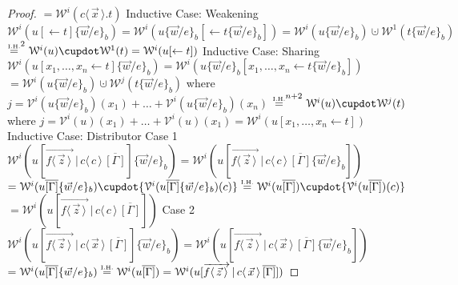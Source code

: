 \documentclass[a4paper,UKenglish,cleveref, autoref]{lipics-v2019}
\newcommand{\set}[1]{ \{ #1 \} }
\newcommand{\fake}[3]{#1 \langle \, #2 \, \rangle . #3}
\newcommand{\share}[3]{#1 [#2 \leftarrow #3]}
\newcommand{\dist}[5]{#1 [ #2 \, \vert \, \fakedist{#4}{#5} \, #3 ]}
\newcommand{\fakedist}[2]{#1 \langle \, #2 \, \rangle}
\newcommand{\vecdist}[2]{\overrightarrow{\fakedist{#1}{#2} \,}}
\newcommand{\psub}[3]{#1 \{ #2 / #3 \}_{b}}
\newcommand{\weight}[2]{\mathcal{W}^{#1}(#2)}
\newcommand{\weightvar}[2]{\mathcal{V}^{#1}(#2)}
\newcommand{\IH}{\stackrel{\hbox{\tiny I.H.}}{\hbox{=}}}
\begin{document}
\begin{proof}
$ = \weight{i}{\fake{c}{\vec{x}}{t}}$
\newline
\newline
{ Inductive Case: Weakening}
\newline
$\weight{i}{\share{u}{}{t} \psub{}{\vec{w}}{e}} = \weight{i}{\share{u\psub{}{\vec{w}}{e}}{}{t\psub{}{\vec{w}}{e}}} = \weight{i}{u\psub{}{\vec{w}}{e}} \cupdot \weight{1}{t \psub{}{\vec{w}}{e}}$
\newline
$\IH^{2} \weight{i}{u} \cupdot \weight{1}{t } = \weight{i}{\share{u}{}{t}}$
\newline
\newline
{ Inductive Case: Sharing}
\newline
$\weight{i}{\share{u}{x_{1}, \dots, x_{n}}{t} \psub{}{\vec{w}}{e}} = \weight{i}{\share{u  \psub{}{\vec{w}}{e}}{x_{1}, \dots, x_{n}}{t  \psub{}{\vec{w}}{e}}}$
\newline
$ = \weight{i}{u  \psub{}{\vec{w}}{e}} \cupdot \weight{j}{t  \psub{}{\vec{w}}{e}}$ where $j = \weightvar{i}{u  \psub{}{\vec{w}}{e}}(x_{1}) + \dots + \weightvar{i}{u  \psub{}{\vec{w}}{e}}(x_{n})$
\newline
$\IH^{n + 2} \weight{i}{u} \cupdot \weight{j}{t}$ where $j = \weightvar{i}{u}(x_{1}) + \dots + \weightvar{i}{u}(x_{1}) = \weight{i}{\share{u}{x_{1}, \dots, x_{n}}{t}}$
\newline
\newline
{ Inductive Case: Distributor}
\newline
Case 1
\newline
$\weight{i}{\dist{u}{\vecdist{f}{\vec{z}}}{\overline{[\Gamma]}}{c}{c} \psub{}{\vec{w}}{e}} = \weight{i}{\dist{u}{\vecdist{f}{\vec{z}}}{\overline{[\Gamma]} \psub{}{\vec{w}}{e} }{c}{c}}$
\newline
$ = \weight{i}{u \overline{[\Gamma]} \psub{}{\vec{w}}{e}} \cupdot \set{\weightvar{i}{u \overline{[\Gamma]} \psub{}{\vec{w}}{e}}(c)} \IH \weight{i}{u \overline{[\Gamma]}} \cupdot \set{\weightvar{i}{u \overline{[\Gamma]}}(c)}$
\newline
$ = \weight{i}{\dist{u}{\vecdist{f}{\vec{z}}}{\overline{[\Gamma]}}{c}{c}}$
\newline
Case 2
\newline
$\weight{i}{\dist{u}{\vecdist{f}{\vec{z}}}{\overline{[\Gamma]}}{c}{\vec{x}} \psub{}{\vec{w}}{e}} = \weight{i}{\dist{u}{\vecdist{f}{\vec{z}}}{\overline{[\Gamma]} \psub{}{\vec{w}}{e} }{c}{\vec{x}}}$
\newline
$ = \weight{i}{u \overline{[\Gamma]} \psub{}{\vec{w}}{e}} \IH \weight{i}{u \overline{[\Gamma]}} = \weight{i}{\dist{u}{\vecdist{f}{\vec{z}}}{\overline{[\Gamma]}}{c}{\vec{x}}}$
\end{proof}
\end{document}
